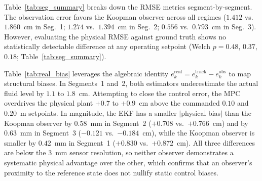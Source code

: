 \documentclass[asi,article,accept,pdftex,moreauthors]{Definitions/mdpi}
\begin{document}
{Table~\ref{tab:seg_summary} breaks down the RMSE metrics segment-by-segment. The observation error favors the Koopman observer across all regimes ($1.412$ vs.\ $1.860$~cm in Seg.~1; $1.274$ vs.\ $1.394$~cm in Seg.~2; $0.556$ vs.\ $0.793$~cm in Seg.~3). However, evaluating the physical RMSE against ground truth shows no statistically detectable difference at any operating setpoint (Welch $p=0.48$, $0.37$, $0.18$; Table~\ref{tab:seg_summary}).}

\begin{table}[H]
  \caption{Per-segment RMSE (cm, mean $\pm\sigma$ over five runs; $p$-values quoted in the text are Welch tests on the per-run RMSE distributions).}
  \label{tab:seg_summary}
\end{table}

{Table~\ref{tab:real_bias} leverages the algebraic identity $e^\mathrm{real}_k = e^\mathrm{track}_k - e^\mathrm{obs}_k$ to map structural biases. In Segments~1 and~2, both estimators underestimate the actual fluid level by $1.1$ to $1.8$~cm. Attempting to close the control error, the MPC overdrives the physical plant $+0.7$ to $+0.9$~cm above the commanded $0.10$ and $0.20$~m setpoints. In magnitude, the EKF has a smaller $|$physical bias$|$ than the Koopman observer by $0.58$~mm in Segment~2 ($+0.708$ vs.\ $+0.766$~cm) and by $0.63$~mm in Segment~3 ($-0.121$ vs.\ $-0.184$~cm), while the Koopman observer is smaller by $0.42$~mm in Segment~1 ($+0.830$ vs.\ $+0.872$~cm). All three differences are below the $3$~mm sensor resolution, so neither observer demonstrates a systematic physical advantage over the other, which confirms that an observer's proximity to the reference state does not nullify static control biases.}
\end{document}

